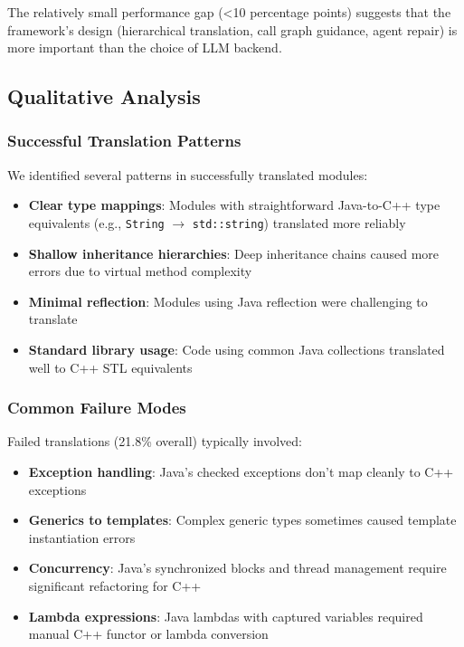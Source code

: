 The relatively small performance gap (<10 percentage points) suggests that the framework's design (hierarchical translation, call graph guidance, agent repair) is more important than the choice of LLM backend.

\subsection{Qualitative Analysis}

\subsubsection{Successful Translation Patterns}

We identified several patterns in successfully translated modules:

\begin{itemize}
\item \textbf{Clear type mappings}: Modules with straightforward Java-to-C++ type equivalents (e.g., \texttt{String} $\rightarrow$ \texttt{std::string}) translated more reliably
\item \textbf{Shallow inheritance hierarchies}: Deep inheritance chains caused more errors due to virtual method complexity
\item \textbf{Minimal reflection}: Modules using Java reflection were challenging to translate
\item \textbf{Standard library usage}: Code using common Java collections translated well to C++ STL equivalents
\end{itemize}

\subsubsection{Common Failure Modes}

Failed translations (21.8\% overall) typically involved:

\begin{itemize}
\item \textbf{Exception handling}: Java's checked exceptions don't map cleanly to C++ exceptions
\item \textbf{Generics to templates}: Complex generic types sometimes caused template instantiation errors
\item \textbf{Concurrency}: Java's synchronized blocks and thread management require significant refactoring for C++
\item \textbf{Lambda expressions}: Java lambdas with captured variables required manual C++ functor or lambda conversion
\end{itemize}

